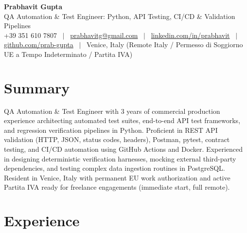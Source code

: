 \documentclass[a4paper,10pt]{article}
\begin{document}
\begin{minipage}[c]{0.80\textwidth}
  {\Huge\bfseries Prabhavit Gupta}\\[3pt]
  {\color{accent}\large QA Automation \& Test Engineer: Python, API Testing, CI/CD \& Validation Pipelines}\\[6pt]
  {\footnotesize +39 351 610 7807 ~$\vert$~
  \href{mailto:prabhavitg@gmail.com}{prabhavitg@gmail.com} ~$\vert$~
  \href{https://www.linkedin.com/in/prabhavit/}{linkedin.com/in/prabhavit} ~$\vert$~
  \href{https://github.com/prab-gupta}{github.com/prab-gupta} ~$\vert$~
  Venice, Italy (Remote Italy / Permesso di Soggiorno UE a Tempo Indeterminato / Partita IVA)}
\end{minipage}\hfill

\section{Summary}
QA Automation \& Test Engineer with 3 years of commercial production experience architecting automated test suites, end-to-end API test frameworks, and regression verification pipelines in Python. Proficient in REST API validation (HTTP, JSON, status codes, headers), Postman, pytest, contract testing, and CI/CD automation using GitHub Actions and Docker. Experienced in designing deterministic verification harnesses, mocking external third-party dependencies, and testing complex data ingestion routines in PostgreSQL. Resident in Venice, Italy with permanent EU work authorization and active Partita IVA ready for freelance engagements (immediate start, full remote).

\section{Experience}
\end{document}
